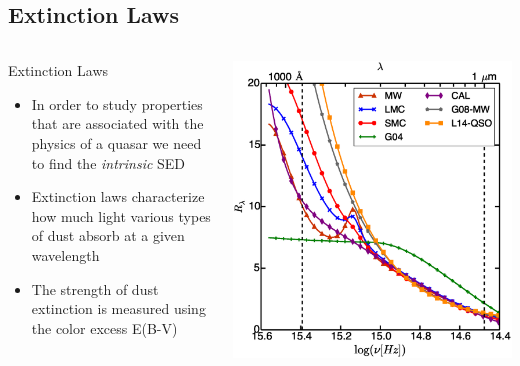 \documentclass[landscape,9pt]{beamer}
\begin{document}
\subsection{Extinction Laws}
\begin{frame}
	\begin{columns}
		\begin{column}{0.35\textwidth}
			\begin{block}{Extinction Laws}
				\begin{itemize}
					\item In order to study properties that are associated with the physics of a quasar we need to find the {\em intrinsic} SED
					\item Extinction laws characterize how much light various types of dust absorb at a given wavelength
					\item The strength of dust extinction is measured using the color excess E(B-V)
				\end{itemize}
			\end{block}
		\end{column}
		\begin{column}{0.65\textwidth}
			\includegraphics[width=\textwidth]{../images/Dust/f4}
		\end{column}
	\end{columns}
\end{frame}
\end{document}
